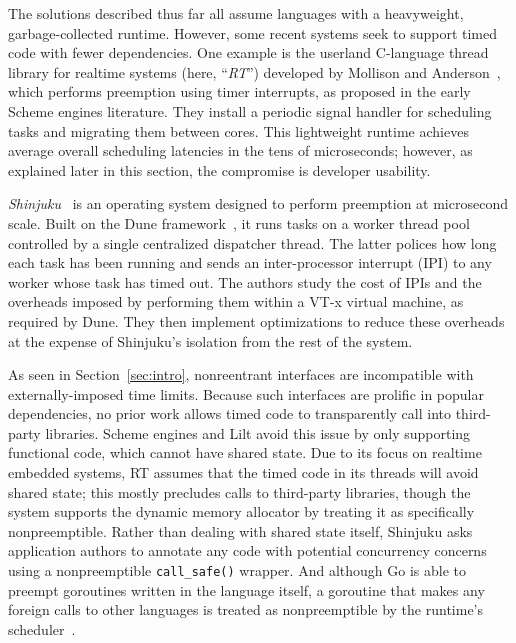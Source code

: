 The solutions described thus far all assume languages with a heavyweight,
garbage-collected runtime.  However, some recent systems seek
to support timed code with fewer
dependencies.  One example is the userland C-language thread library for realtime
systems (here, ``\textit{RT}'') developed by Mollison and
Anderson~\cite{mollison:rtas2013}, which performs
preemption using timer interrupts, as proposed in the early Scheme engines
literature.  They install a periodic signal handler for scheduling
tasks and migrating them between cores.  This lightweight runtime
achieves average overall scheduling latencies in the tens of microseconds;
however, as explained later in this section, the compromise is developer usability.

\textit{Shinjuku}~\cite{Kaffes:nsdi2019} is an operating system designed to perform
preemption at microsecond scale.  Built on the Dune framework~\cite{Belay:osdi2012},
it runs tasks on a worker thread pool controlled by a single centralized
dispatcher thread.  The latter polices how long each task has been running and
sends an inter-processor interrupt (IPI) to any worker whose task has timed out.
The authors study the cost of IPIs and the overheads
imposed by performing them within a VT-x virtual machine, as required by Dune.  They
then implement optimizations to reduce these overheads at the expense of Shinjuku's
isolation from the rest of the system.

As seen in Section~\ref{sec:intro}, nonreentrant interfaces are
incompatible with externally-imposed time limits.  Because such interfaces are
prolific in popular dependencies, no prior work allows timed code to transparently
call into third-party libraries.  Scheme engines and
Lilt avoid this issue by only supporting functional code, which cannot have shared
state.  Due to its focus on realtime embedded systems, RT assumes
that the timed code in its threads will avoid shared state; this mostly precludes
calls to third-party libraries, though the system supports the dynamic memory
allocator by treating it as specifically nonpreemptible.  Rather than dealing with
shared state itself, Shinjuku asks application authors to annotate any code with
potential concurrency concerns using a nonpreemptible \texttt{call\_safe()} wrapper.
And although Go is able to preempt goroutines written in the language
itself, a
goroutine that makes any foreign calls to other languages is treated as
nonpreemptible by the runtime's scheduler~\cite{www-golang-fficall}.
